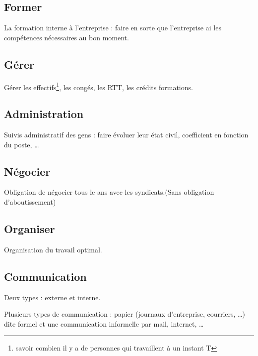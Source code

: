 	\subsection{Former}
	La formation interne à l'entreprise : faire en sorte que l'entreprise ai les compétences nécessaires au bon moment.

	\subsection{Gérer}
	Gérer les effectifs\footnote{savoir combien il y a de personnes qui travaillent à un instant T}, les congés, les RTT, les crédits formations.
	
	\subsection{Administration}
	Suivis administratif des gens : faire évoluer leur état civil, coefficient en fonction du poste, \ldots

	\subsection{Négocier}
	Obligation de négocier tous le ans avec les syndicats.(Sans obligation d'aboutissement) 

	\subsection{Organiser}
	Organisation du travail optimal.

	\subsection{Communication}
	Deux types : externe et interne. 

	Plusieurs types de communication : papier (journaux d'entreprise, courriers, \ldots) dite formel et une communication informelle par mail, internet,
	\ldots


	

